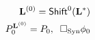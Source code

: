 \documentclass[preview]{standalone}
\begin{document}
\begin{align*}
\special{dvisvgm:raw <g id='unique000'>}\mathbf{L}^{(0)} = \mathsf{Shift}^0(\mathbf{L}^*)\\P_0^{\mathbf{L}^{(0)}} = P_0,\;\; \Box_{\text{Syn}}\phi_0\special{dvisvgm:raw </g>}
\end{align*}
\end{document}
